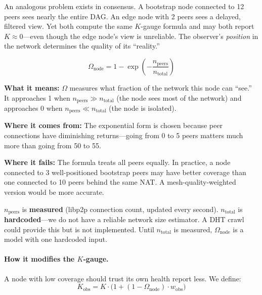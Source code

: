 \documentclass[11pt,a4paper]{article}
\begin{document}
An analogous problem exists in consensus. A bootstrap node connected to 12 peers sees nearly the entire DAG. An edge node with 2 peers sees a delayed, filtered view. Yet both compute the same $K$-gauge formula and may both report $K \approx 0$---even though the edge node's view is unreliable. The observer's \emph{position} in the network determines the quality of its ``reality.''

\begin{susskindbox}
\begin{equation}
\Omega_{\text{node}} = 1 - \exp\!\left(-\frac{n_{\text{peers}}}{n_{\text{total}}}\right)
\label{eq:omega}
\end{equation}

\textbf{What it means:} $\Omega$ measures what fraction of the network this node can ``see.'' It approaches 1 when $n_{\text{peers}} \gg n_{\text{total}}$ (the node sees most of the network) and approaches 0 when $n_{\text{peers}} \ll n_{\text{total}}$ (the node is isolated).

\textbf{Where it comes from:} The exponential form is chosen because peer connections have diminishing returns---going from 0 to 5 peers matters much more than going from 50 to 55.

\textbf{Where it fails:} The formula treats all peers equally. In practice, a node connected to 3 well-positioned bootstrap peers may have better coverage than one connected to 10 peers behind the same NAT. A mesh-quality-weighted version would be more accurate.
\end{susskindbox}

\begin{honesty}
$n_{\text{peers}}$ is \textbf{measured} (libp2p connection count, updated every second). $n_{\text{total}}$ is \textbf{hardcoded}---we do not have a reliable network size estimator. A DHT crawl could provide this but is not implemented. Until $n_{\text{total}}$ is measured, $\Omega_{\text{node}}$ is a model with one hardcoded input.
\end{honesty}

\paragraph{How it modifies the $K$-gauge.} A node with low coverage should trust its own health report less. We define:
\begin{equation}
K_{\text{obs}} = K \cdot \bigl(1 + (1 - \Omega_{\text{node}}) \cdot w_{\text{obs}}\bigr)
\label{eq:kobs}
\end{equation}
\end{document}

